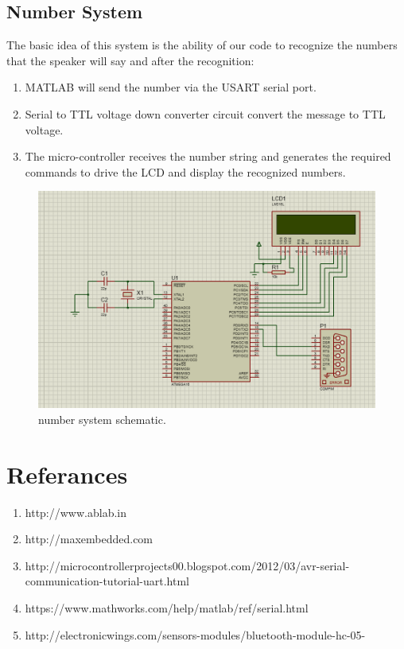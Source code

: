 \documentclass[12pt, a4paper, twoside]{report}
\begin{document}
\subsection{Number System}
The basic idea of this system is the ability of our code to recognize the numbers that the speaker will say and after the recognition:
\begin{enumerate}[noitemsep]
\item MATLAB will send the number via the USART serial port.
\item Serial to TTL voltage down converter circuit convert the message to TTL voltage.
\item The micro-controller receives the number string and generates the required commands to drive the LCD and display the recognized numbers.
\end{enumerate}
\begin{figure}[H]
	\centering
	\includegraphics[width=1\textwidth]
	{images/chapter6/hardware-6}
	\caption{number system schematic.}
	\label{fig:hardware-6}
\end{figure}


\section*{Referances}
\begin{enumerate}
\item http://www.ablab.in
\item http://maxembedded.com
\item http://microcontrollerprojects00.blogspot.com/2012/03/avr-serial-communication-tutorial-uart.html
\item https://www.mathworks.com/help/matlab/ref/serial.html
\item http://electronicwings.com/sensors-modules/bluetooth-module-hc-05-
\end{enumerate}
\end{document}
